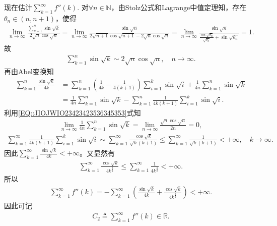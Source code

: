 \documentclass[../../main.tex]{subfiles}%
\begin{document}
\begin{solution}
现在估计$\sum\limits_{k=1}^{\infty} f''(k)$.
对$\forall n\in \mathbb{N}$，由Stolz公式和Lagrange中值定理知，存在$\theta_n \in (n,n+1)$，使得
\begin{align*}
\lim\limits_{n\rightarrow \infty} \frac{\sum\limits_{k=1}^n \sin \sqrt{k}}{2\sqrt{n}\cos \sqrt{n}}
= \lim\limits_{n\rightarrow \infty} \frac{\sin \sqrt{n}}{2\sqrt{n+1}\cos \sqrt{n+1} - 2\sqrt{n}\cos \sqrt{n}} 
= \lim\limits_{n\rightarrow \infty} \frac{\sin \sqrt{n}}{\displaystyle \frac{\cos \sqrt{\theta_n}}{\sqrt{\theta_n}} + \sin \sqrt{\theta_n}}
= 1.
\end{align*}
故
\begin{align}
\sum\limits_{k=1}^n \sin \sqrt{k} \sim 2\sqrt{n}\cos \sqrt{n},\quad n\rightarrow \infty.
\label{EQ::JIOJWIO23423423536345353}
\end{align}
再由Abel变换知
\begin{align*}
\sum\limits_{k=1}^n \frac{\sin \sqrt{k}}{4k}
&= \sum\limits_{k=1}^n \left( \frac{1}{4k} - \frac{1}{4(k+1)} \right) \sum\limits_{i=1}^k \sin \sqrt{i} + \frac{1}{4n}\sum\limits_{k=1}^n \sin \sqrt{k} \\
&= \frac{1}{4n}\sum\limits_{k=1}^n \sin \sqrt{k} - \sum\limits_{k=1}^n \frac{1}{4k(k+1)}\sum\limits_{i=1}^k \sin \sqrt{i}.
\end{align*}
利用\eqref{EQ::JIOJWIO23423423536345353}式知
\begin{align*}
\lim\limits_{n\rightarrow \infty} \frac{1}{4n}\sum\limits_{k=1}^n \sin \sqrt{k}
= \lim\limits_{n\rightarrow \infty} \frac{\sqrt{n}\cos \sqrt{n}}{2n} = 0,
\end{align*}
\begin{align*}
\sum\limits_{k=1}^{\infty} \frac{1}{4k(k+1)}\sum\limits_{i=1}^k \sin \sqrt{i}
\sim \sum\limits_{k=1}^{\infty} \frac{\cos \sqrt{k}}{\sqrt{k}(k+1)}
\leqslant \sum\limits_{k=1}^{\infty} \frac{1}{\sqrt{k}(k+1)} < +\infty,\quad k\rightarrow \infty.
\end{align*}
因此$\sum\limits_{k=1}^{\infty} \frac{\sin \sqrt{k}}{4k} < +\infty$。又显然有
\begin{align*}
\sum\limits_{k=1}^{\infty} \frac{\cos \sqrt{k}}{4k^{\frac{3}{2}}}
\leqslant \sum\limits_{k=1}^{\infty} \frac{1}{4k^{\frac{3}{2}}} < +\infty.
\end{align*}
所以
\begin{align*}
\sum\limits_{k=1}^{\infty} f''(k)
= -\sum\limits_{k=1}^{\infty} \left( \frac{\sin \sqrt{k}}{4k} + \frac{\cos \sqrt{k}}{4k^{\frac{3}{2}}} \right) < +\infty.
\end{align*}
因此可记
\begin{align}
C_2 \triangleq \sum\limits_{k=1}^{\infty} f''(k) \in \mathbb{R}.
\label{EQ::JIOJWIO23423423536345354}
\end{align}


\end{solution}
\end{document}
